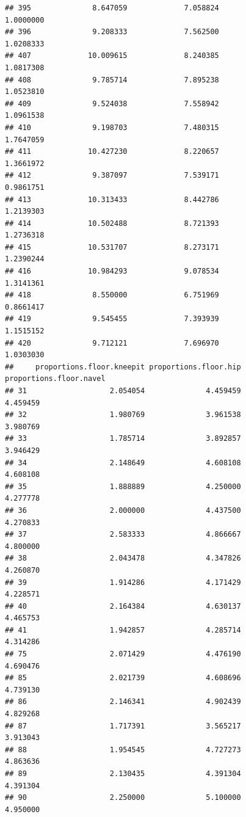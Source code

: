 \documentclass[]{article}
\begin{document}
\begin{verbatim}
## 395              8.647059             7.058824               1.0000000
## 396              9.208333             7.562500               1.0208333
## 407             10.009615             8.240385               1.0817308
## 408              9.785714             7.895238               1.0523810
## 409              9.524038             7.558942               1.0961538
## 410              9.198703             7.480315               1.7647059
## 411             10.427230             8.220657               1.3661972
## 412              9.387097             7.539171               0.9861751
## 413             10.313433             8.442786               1.2139303
## 414             10.502488             8.721393               1.2736318
## 415             10.531707             8.273171               1.2390244
## 416             10.984293             9.078534               1.3141361
## 418              8.550000             6.751969               0.8661417
## 419              9.545455             7.393939               1.1515152
## 420              9.712121             7.696970               1.0303030
##     proportions.floor.kneepit proportions.floor.hip proportions.floor.navel
## 31                   2.054054              4.459459                4.459459
## 32                   1.980769              3.961538                3.980769
## 33                   1.785714              3.892857                3.946429
## 34                   2.148649              4.608108                4.608108
## 35                   1.888889              4.250000                4.277778
## 36                   2.000000              4.437500                4.270833
## 37                   2.583333              4.866667                4.800000
## 38                   2.043478              4.347826                4.260870
## 39                   1.914286              4.171429                4.228571
## 40                   2.164384              4.630137                4.465753
## 41                   1.942857              4.285714                4.314286
## 75                   2.071429              4.476190                4.690476
## 85                   2.021739              4.608696                4.739130
## 86                   2.146341              4.902439                4.829268
## 87                   1.717391              3.565217                3.913043
## 88                   1.954545              4.727273                4.863636
## 89                   2.130435              4.391304                4.391304
## 90                   2.250000              5.100000                4.950000

\end{verbatim}
\end{document}
